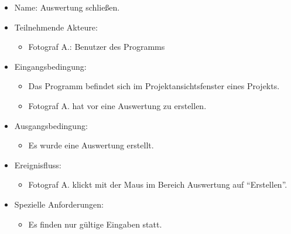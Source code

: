 	\begin{itemize}
		\item Name: Auswertung schließen.
		\item Teilnehmende Akteure:
		\begin{itemize}
			\item	Fotograf A.: Benutzer des Programms		
		\end{itemize}
		\item Eingangsbedingung:
		\begin{itemize}
			\item	Das Programm befindet sich im Projektansichtsfenster eines Projekts.
			\item Fotograf A. hat vor eine Auswertung zu erstellen.
		\end{itemize}
		\item Ausgangsbedingung:
		\begin{itemize}
			\item	Es wurde eine Auswertung erstellt.	
		\end{itemize}
		\item Ereignisfluss:
		\begin{itemize}
			\item Fotograf A. klickt mit der Maus im Bereich Auswertung auf "`Erstellen"'.
		\end{itemize}
		\item Spezielle Anforderungen:
		\begin{itemize}
			\item	Es finden nur gültige Eingaben statt.			
		\end{itemize}			
	\end{itemize}
	
	

